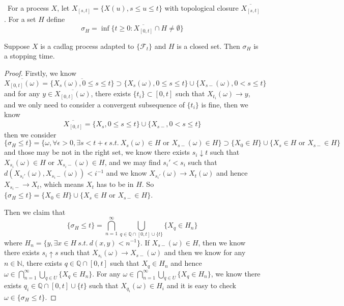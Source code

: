 \documentclass[lang=en, color=blue, ]{elegantbook}
\newcommand{\F}{\mathcal{F}}
\newcommand{\Q}{\mathbb{Q}}
\newcommand{\N}{\mathbb{N}}
\begin{document}
\begin{definition}\
For a process $X$, let $X_{[s,t]} = \{X(u), s\leq u \leq t\}$ with topological closure $\overline{X_{[s,t]}}$. For a set $H$ define
\[\sigma_H = \inf\{t\geq 0: \overline{X_{[0,t]}}\cap H \neq \emptyset\}\]
\end{definition}

\begin{lemma}
    Suppose $X$ is a cadlag process adapted to $\{\F_t\}$ and $H$ is a closed set. Then $\sigma_H$ is a stopping time.
\end{lemma}
\begin{proof}\par
    Firstly, we know
    \[\overline{X_{[0,t]}(\omega)} = \overline{\{X_s(\omega), 0\leq s \leq t\}} \supset \{X_s(\omega), 0 \leq s \leq t\}\cup \{X_{s-}(\omega), 0<s\leq t\}\]
    and for any $y\in \overline{X_{[0,t]}(\omega)}$, there exists $\{t_i\}\subset [0,t]$ such that $X_{t_i}(\omega) \to y$, and we only need to consider a convergent subsequence of $\{t_i\}$ is fine, then we know
    \[\overline{X_{[0,t]}} = \{X_s, 0\leq s \leq t\}\cup \{X_{s-}, 0< s \leq t\}\]
    then we consider
    \[\{\sigma_H\leq t\} = \{\omega, \forall \epsilon > 0, \exists s<t+\epsilon \ s.t.\ X_{s}(\omega) \in H \text{ or }X_{s-}(\omega) \in H\} \supset \{X_0 \in H\}\cup \{X_s \in H \text{ or }X_{s-} \in H\}\]
    and those may be not in the right set, we know there exists $s_i \downarrow t$ such that $X_{s_i}(\omega) \in H$ or $X_{s_i-}(\omega) \in H$, and we may find $s_i' < s_i$ such that $d(X_{s_i'}(\omega),X_{s_i-}(\omega)) < i^{-1}$ and we know $X_{s_i'}(\omega) \to X_t(\omega)$ and hence $X_{s_i-}\to X_t$, which means $X_t$ has to be in $H$. So $\{\sigma_H\leq t\} = \{X_0 \in H\}\cup\{X_s \in H \text{ or }X_{s-}\in H\}$.\par
    Then we claim that
    \[\{\sigma_H \leq t\} = \bigcap_{n=1}^{\infty}\bigcup_{q\in \Q\cap[0,t]\cup\{t\}}\{X_q\in H_n\}\]
    where $H_n = \{y,\exists x\in H\ s.t.\ d(x,y)<n^{-1}\}$. If $X_{s-}(\omega)\in H$, then we know there exists $s_i\uparrow s$ such that $X_{s_i}(\omega) \to X_{s-}(\omega)$ and then we know for any $n\in \N$, there exists $q\in\Q\cap[0,t]$ such that $X_q \in H_n$ and hence $\omega\in\bigcap_{n=1}^{\infty}\bigcup_{q\in U}\{X_q\in H_n\}$. For any $\omega\in \bigcap_{n=1}^{\infty}\bigcup_{q\in U}\{X_q\in H_n\}$, we know there exists $q_i\in \Q\cap[0,t]\cup\{t\}$ such that $X_{q_i}(\omega) \in H_i$ and it is easy to check $\omega \in \{\sigma_H\leq t\}$.
    
\end{proof}
\end{document}
